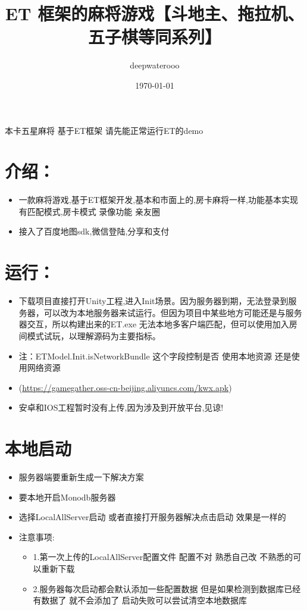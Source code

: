 \documentclass[9pt, b5paper]{article}
\author{deepwaterooo}
\date{\today}
\title{ET 框架的麻将游戏【斗地主、拖拉机、五子棋等同系列】}
\begin{document}
\maketitle
\tableofcontents

本卡五星麻将 基于ET框架 请先能正常运行ET的demo  

\section{介绍：}
\label{sec:org8f789b0}
\begin{itemize}
\item 一款麻将游戏,基于ET框架开发,基本和市面上的,房卡麻将一样,功能基本实现 有匹配模式,房卡模式 录像功能 亲友圈
\item 接入了百度地图sdk,微信登陆,分享和支付
\end{itemize}

\section{运行：}
\label{sec:org47dc06b}
\begin{itemize}
\item 下载项目直接打开Unity工程,进入Init场景。因为服务器到期，无法登录到服务器，可以改为本地服务器来试运行。但因为项目中某些地方可能还是与服务器交互，所以构建出来的ET.exe 无法本地多客户端匹配，但可以使用加入房间模式试玩，以理解源码为主要指标。
\item 注：ETModel.Init.isNetworkBundle 这个字段控制是否 使用本地资源 还是使用网络资源
\item\relax [打好包apk下载](\url{https://gamegather.oss-cn-beijing.aliyuncs.com/kwx.apk})
\item 安卓和IOS工程暂时没有上传,因为涉及到开放平台,见谅!
\end{itemize}

\section{本地启动}
\label{sec:org444b250}
\begin{itemize}
\item 服务器端要重新生成一下解决方案
\item 要本地开启Monodb服务器
\item 选择LocalAllServer启动 或者直接打开服务器解决点击启动 效果是一样的

\item 注意事项:  
\begin{itemize}
\item 1.第一次上传的LocalAllServer配置文件 配置不对 熟悉自己改 不熟悉的可以重新下载
\item 2.服务器每次启动都会默认添加一些配置数据 但是如果检测到数据库已经有数据了 就不会添加了 启动失败可以尝试清空本地数据库
\end{itemize}
\end{itemize}
\end{document}
